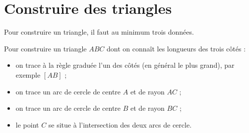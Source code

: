 \section{Construire des triangles}    
    \begin{remarque}
        Pour construire un triangle, il faut au minimum trois données.
    \end{remarque}
    \begin{methode*1}
        Pour construire un triangle $ABC$ dont on connaît les longueurs des trois côtés :
        \begin{itemize}
           \item on trace à la règle graduée l'un des côtés (en général le plus grand), par exemple $[AB]$ ;
           \item on trace un arc de cercle de centre $A$ et de rayon $AC$ ;
           \item on trace un arc de cercle de centre $B$ et de rayon $BC$ ;
           \item le point $C$ se situe à l'intersection des deux arcs de cercle.
        \end{itemize}
         

\end{methode*1}
